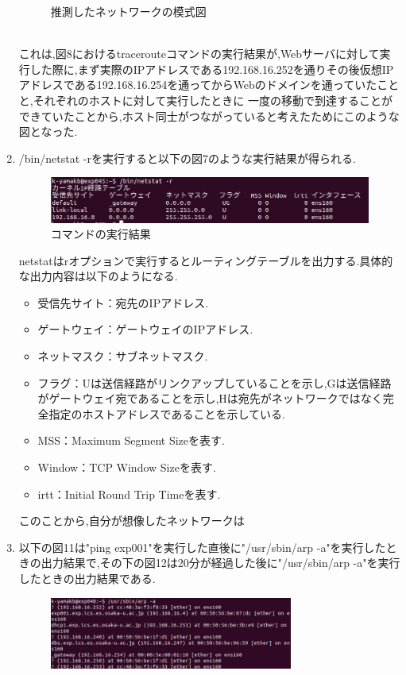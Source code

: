 \documentclass[dvipdfmx]{jarticle}
\begin{document}
\begin{enumerate}
\begin{figure}[h]
        \caption{推測したネットワークの模式図}
    \end{figure}
    \\これは,図8におけるtracerouteコマンドの実行結果が,Webサーバに対して実行した際に,まず実際のIPアドレスである192.168.16.252を通りその後仮想IPアドレスである192.168.16.254を通ってからWebのドメインを通っていたことと,それぞれのホストに対して実行したときに
    一度の移動で到達することができていたことから,ホスト同士がつながっていると考えたためにこのような図となった.
    \item /bin/netstat -rを実行すると以下の図7のような実行結果が得られる.
    \begin{figure}[h]
        \centering
        \includegraphics[width=14cm]{1-2-8.png}
        \caption{コマンドの実行結果}
    \end{figure}
    netstatはrオプションで実行するとルーティングテーブルを出力する.具体的な出力内容は以下のようになる.
    \begin{itemize}
        \item 受信先サイト：宛先のIPアドレス.
        \item ゲートウェイ：ゲートウェイのIPアドレス.
        \item ネットマスク：サブネットマスク.
        \item フラグ：Uは送信経路がリンクアップしていることを示し,Gは送信経路がゲートウェイ宛であることを示し,Hは宛先がネットワークではなく完全指定のホストアドレスであることを示している.
        \item MSS：Maximum Segment Sizeを表す.
        \item Window：TCP Window Sizeを表す.
        \item irtt：Initial Round Trip Timeを表す.
    \end{itemize}
    このことから,自分が想像したネットワークは
    \item 以下の図11は"ping exp001"を実行した直後に"/usr/sbin/arp -a"を実行したときの出力結果で,その下の図12は20分が経過した後に"/usr/sbin/arp -a"を実行したときの出力結果である.
    \begin{figure}[h]
        \centering
        \includegraphics[width=8cm]{1-2-9-1.png}

\end{figure}
\end{enumerate}
\end{document}
